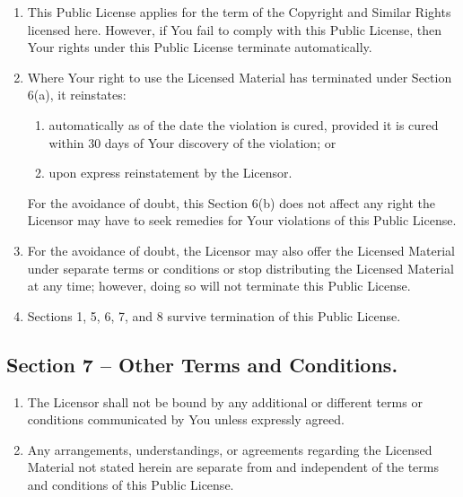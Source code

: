 \documentclass[]{book}
\begin{document}
\begin{enumerate}
\def\labelenumi{\alph{enumi}.}
\item
  This Public License applies for the term of the Copyright and Similar Rights licensed here. However, if You fail to comply with this Public License, then Your rights under this Public License terminate automatically.
\item
  Where Your right to use the Licensed Material has terminated under Section 6(a), it reinstates:

  \begin{enumerate}
  \def\labelenumii{\arabic{enumii}.}
  \item
    automatically as of the date the violation is cured, provided it is cured within 30 days of Your discovery of the violation; or
  \item
    upon express reinstatement by the Licensor.
  \end{enumerate}

  For the avoidance of doubt, this Section 6(b) does not affect any right the Licensor may have to seek remedies for Your violations of this Public License.
\item
  For the avoidance of doubt, the Licensor may also offer the Licensed Material under separate terms or conditions or stop distributing the Licensed Material at any time; however, doing so will not terminate this Public License.
\item
  Sections 1, 5, 6, 7, and 8 survive termination of this Public License.
\end{enumerate}

\hypertarget{section-7-other-terms-and-conditions.}{%
\subsection{Section 7 -- Other Terms and Conditions.}\label{section-7-other-terms-and-conditions.}}

\begin{enumerate}
\def\labelenumi{\alph{enumi}.}
\item
  The Licensor shall not be bound by any additional or different terms or conditions communicated by You unless expressly agreed.
\item
  Any arrangements, understandings, or agreements regarding the Licensed Material not stated herein are separate from and independent of the terms and conditions of this Public License.
\end{enumerate}
\end{document}
